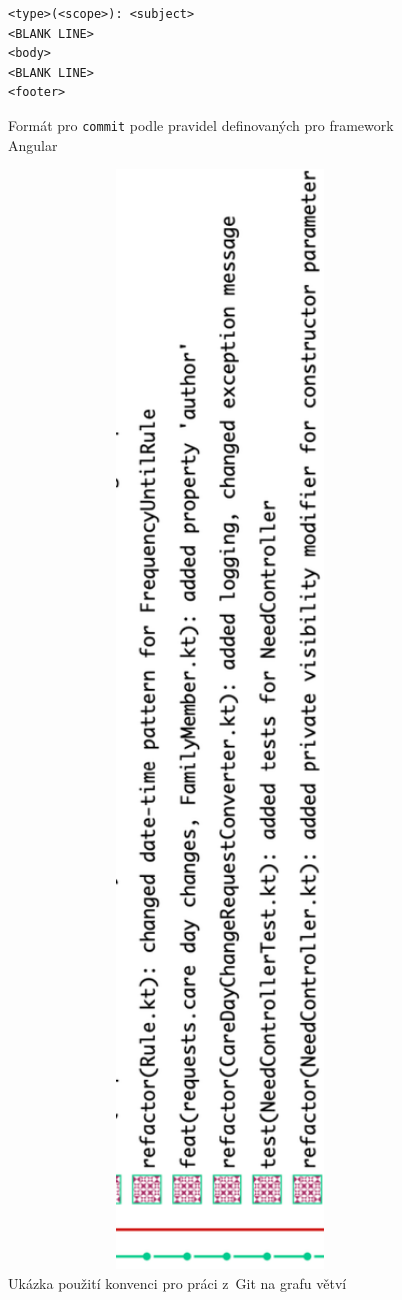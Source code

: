     \begin{figure}
            \begin{verbatim}
<type>(<scope>): <subject>
<BLANK LINE>
<body>
<BLANK LINE>
<footer>
            \end{verbatim}
            \caption{Formát pro \texttt{commit} podle pravidel definovaných pro framework Angular} 
            \label{code:angular-commit}
    \end{figure}
    \begin{figure}
	   \includegraphics[angle=-90, width=1.0\textwidth]{pdfs/GitLabTree}
	   \caption[Ukázka použití konvence pro práci z~Git]{Ukázka použití konvenci pro práci z~Git na grafu větví}\label{image:gitlab-tree}
    \end{figure}
